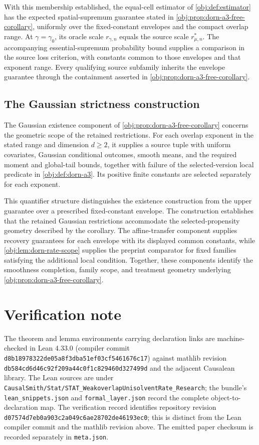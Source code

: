 \documentclass[11pt]{article}
\begin{document}
With this membership established, the equal-cell estimator of \cref{obj:def:estimator} has the expected spatial-supremum guarantee stated in \cref{obj:prop:dorn-a3-free-corollary}, uniformly over the fixed-constant envelopes and the compact overlap range. At \(\gamma=\gamma_0\), its oracle scale \(r_{\gamma,n}\) equals the source scale \(r^*_{\mu,n}\). The accompanying essential-supremum probability bound supplies a comparison in the source loss criterion, with constants common to those envelopes and that exponent range. Every qualifying source subfamily inherits the envelope guarantee through the containment asserted in \cref{obj:prop:dorn-a3-free-corollary}.

\subsection{The Gaussian strictness construction}

The Gaussian existence component of \cref{obj:prop:dorn-a3-free-corollary} concerns the geometric scope of the retained restrictions. For each overlap exponent in the stated range and dimension \(d\ge2\), it supplies a source tuple with uniform covariates, Gaussian conditional outcomes, smooth means, and the required moment and global-tail bounds, together with failure of the selected-version local predicate in \cref{obj:def:dorn-a3}. Its positive finite constants are selected separately for each exponent.

This quantifier structure distinguishes the existence construction from the upper guarantee over a prescribed fixed-constant envelope. The construction establishes that the retained Gaussian restrictions accommodate the selected-propensity geometry described by the corollary. The affine-transfer component supplies recovery guarantees for each envelope with its displayed common constants, while \cref{obj:lem:dorn-rate-scope} supplies the preprint comparator for fixed families satisfying the additional local condition. Together, these components identify the smoothness completion, family scope, and treatment geometry underlying \cref{obj:prop:dorn-a3-free-corollary}.


\section{Verification note}

The theorem and lemma environments carrying declaration links are machine-checked in Lean 4.33.0 (compiler commit \texttt{d8b18978322de05a8f3dba51ef03cf5461676c17}) against mathlib revision \texttt{db584cd6d46c92f209a44c0f1c829460d327499d} and the adjacent Causalean library. The Lean sources are under \texttt{CausalSmith/Stat/STAT\_WeakoverlapUnisolventRate\_Research}; the bundle's \texttt{lean\_snippets.json} and \texttt{formal\_layer.json} record the complete object-to-declaration map. The verification record identifies repository revision \texttt{d07574d7eb0a903c2a049c6ae28702de46193ec0}; this is distinct from the Lean compiler commit and the mathlib revision above. The emitted paper checksum is recorded separately in \texttt{meta.json}.
\end{document}
